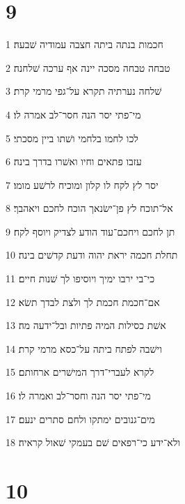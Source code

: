 \chapter{9}

\par 1 חכמות בנתה ביתה חצבה עמודיה שׁבעה׃
\par 2 טבחה טבחה מסכה יינה אף ערכה שׁלחנה׃
\par 3 שׁלחה נערתיה תקרא על־גפי מרמי קרת׃
\par 4 מי־פתי יסר הנה חסר־לב אמרה לו׃
\par 5 לכו לחמו בלחמי ושׁתו ביין מסכתי׃
\par 6 עזבו פתאים וחיו ואשׁרו בדרך בינה׃
\par 7 יסר לץ לקח לו קלון ומוכיח לרשׁע מומו׃
\par 8 אל־תוכח לץ פן־ישׂנאך הוכח לחכם ויאהבך׃
\par 9 תן לחכם ויחכם־עוד הודע לצדיק ויוסף לקח׃
\par 10 תחלת חכמה יראת יהוה ודעת קדשׁים בינה׃
\par 11 כי־בי ירבו ימיך ויוסיפו לך שׁנות חיים׃
\par 12 אם־חכמת חכמת לך ולצת לבדך תשׂא׃
\par 13 אשׁת כסילות המיה פתיות ובל־ידעה מה׃
\par 14 וישׁבה לפתח ביתה על־כסא מרמי קרת׃
\par 15 לקרא לעברי־דרך המישׁרים ארחותם׃
\par 16 מי־פתי יסר הנה וחסר־לב ואמרה לו׃
\par 17 מים־גנובים ימתקו ולחם סתרים ינעם׃
\par 18 ולא־ידע כי־רפאים שׁם בעמקי שׁאול קראיה׃

\chapter{10}

